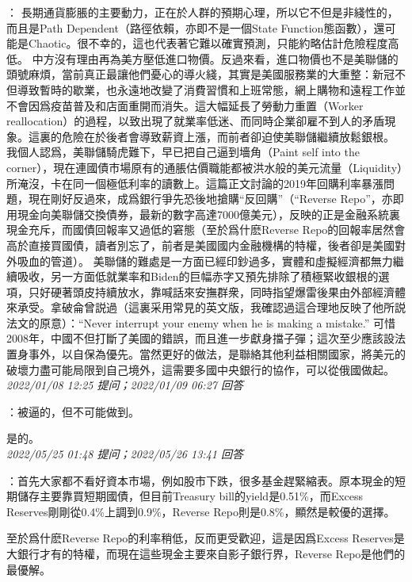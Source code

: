 \documentclass[twocolumn]{ctexart}
\begin{document}
：
長期通貨膨脹的主要動力，正在於人群的預期心理，所以它不但是非綫性的，而且是Path Dependent（路徑依賴，亦即不是一個State Function態函數），還可能是Chaotic。很不幸的，這也代表著它難以確實預測，只能約略估計危險程度高低。
中方沒有理由再為美方壓低進口物價。反過來看，進口物價也不是美聯儲的頭號麻煩，當前真正最讓他們憂心的導火綫，其實是美國服務業的大重整：新冠不但導致暫時的歇業，也永遠地改變了消費習慣和上班常態，網上購物和遠程工作並不會因爲疫苗普及和店面重開而消失。這大幅延長了勞動力重置（Worker reallocation）的過程，以致出現了就業率低迷、而同時企業卻雇不到人的矛盾現象。這裏的危險在於後者會導致薪資上漲，而前者卻迫使美聯儲繼續放鬆銀根。
我個人認爲，美聯儲騎虎難下，早已把自己逼到墻角（Paint self into the corner），現在連國債市場原有的通脹估價職能都被洪水般的美元流量（Liquidity）所淹沒，卡在同一個極低利率的讀數上。這篇正文討論的2019年回購利率暴漲問題，現在剛好反過來，成爲銀行爭先恐後地搶購“反回購”（“Reverse Repo”，亦即用現金向美聯儲交換債券，最新的數字高達7000億美元），反映的正是金融系統裏現金充斥，而國債回報率又過低的窘態（至於爲什麽Reverse Repo的回報率居然會高於直接買國債，讀者別忘了，前者是美國國内金融機構的特權，後者卻是美國對外吸血的管道）。
美聯儲的難處是一方面已經印鈔過多，實體和虛擬經濟都無力繼續吸收，另一方面低就業率和Biden的巨幅赤字又預先排除了積極緊收銀根的選項，只好硬著頭皮持續放水，靠喊話來安撫群衆，同時指望爆雷後果由外部經濟體來承受。拿破侖曾説過（這裏采用常見的英文版，我確認過這合理地反映了他所説法文的原意）：“Never interrupt your enemy when he is making a mistake.” 可惜2008年，中國不但打斷了美國的錯誤，而且進一步獻身擋子彈；這次至少應該設法置身事外，以自保為優先。當然更好的做法，是聯絡其他利益相關國家，將美元的破壞力盡可能局限到自己境外，這需要多國中央銀行的協作，可以從俄國做起。
\\

\textit{\hfill\noindent\small 2022/01/08 12:25 提问；2022/01/09 06:27 回答}

：被逼的，但不可能做到。

是的。
\\

\textit{\hfill\noindent\small 2022/05/25 01:48 提问；2022/05/26 13:41 回答}

：首先大家都不看好資本市場，例如股市下跌，很多基金趕緊縮表。原本現金的短期儲存主要靠買短期國債，但目前Treasury bill的yield是0.51\%，而Excess Reserves剛剛從0.4\%上調到0.9\%，Reverse Repo則是0.8\%，顯然是較優的選擇。

至於爲什麽Reverse Repo的利率稍低，反而更受歡迎，這是因爲Excess Reserves是大銀行才有的特權，而現在這些現金主要來自影子銀行界，Reverse Repo是他們的最優解。
\end{document}

